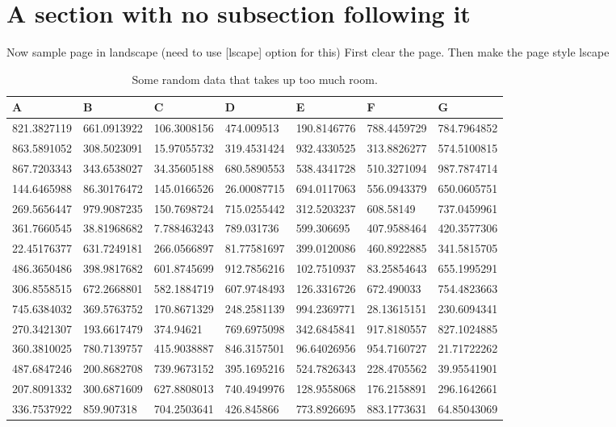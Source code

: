 \documentclass[lscape]{msu-thesis}
\begin{document}
\section{A section with no subsection following it}
\lipsum[9]
 Now sample page in landscape (need to use [lscape] option for this)
 First clear the page. Then make the page style {lscape}
\clearpage\pagestyle{lscape}
\begin{landscape}
\begin{table}
\centering
\begin{tabular}{lllllll}
\toprule
A & B & C & D & E & F & G \\
\midrule
821.3827119 & 661.0913922 & 106.3008156 & 474.009513 & 190.8146776 & 788.4459729 & 784.7964852 \\
863.5891052 & 308.5023091 & 15.97055732 & 319.4531424 & 932.4330525 & 313.8826277 & 574.5100815 \\
867.7203343 & 343.6538027 & 34.35605188 & 680.5890553 & 538.4341728 & 510.3271094 & 987.7874714 \\
144.6465988 & 86.30176472 & 145.0166526 & 26.00087715 & 694.0117063 & 556.0943379 & 650.0605751 \\
269.5656447 & 979.9087235 & 150.7698724 & 715.0255442 & 312.5203237 & 608.58149 & 737.0459961 \\
361.7660545 & 38.81968682 & 7.788463243 & 789.031736 & 599.306695 & 407.9588464 & 420.3577306 \\
22.45176377 & 631.7249181 & 266.0566897 & 81.77581697 & 399.0120086 & 460.8922885 & 341.5815705 \\
486.3650486 & 398.9817682 & 601.8745699 & 912.7856216 & 102.7510937 & 83.25854643 & 655.1995291 \\
306.8558515 & 672.2668801 & 582.1884719 & 607.9748493 & 126.3316726 & 672.490033 & 754.4823663 \\
745.6384032 & 369.5763752 & 170.8671329 & 248.2581139 & 994.2369771 & 28.13615151 & 230.6094341 \\
270.3421307 & 193.6617479 & 374.94621 & 769.6975098 & 342.6845841 & 917.8180557 & 827.1024885 \\
360.3810025 & 780.7139757 & 415.9038887 & 846.3157501 & 96.64026956 & 954.7160727 & 21.71722262 \\
487.6847246 & 200.8682708 & 739.9673152 & 395.1695216 & 524.7826343 & 228.4705562 & 39.95541901 \\
207.8091332 & 300.6871609 & 627.8808013 & 740.4949976 & 128.9558068 & 176.2158891 & 296.1642661 \\
336.7537922 & 859.907318 & 704.2503641 & 426.845866 & 773.8926695 & 883.1773631 & 64.85043069 \\
\bottomrule
\end{tabular}
\caption{Some random data that takes up too much room.}
\end{table}


\end{landscape}
\end{document}
